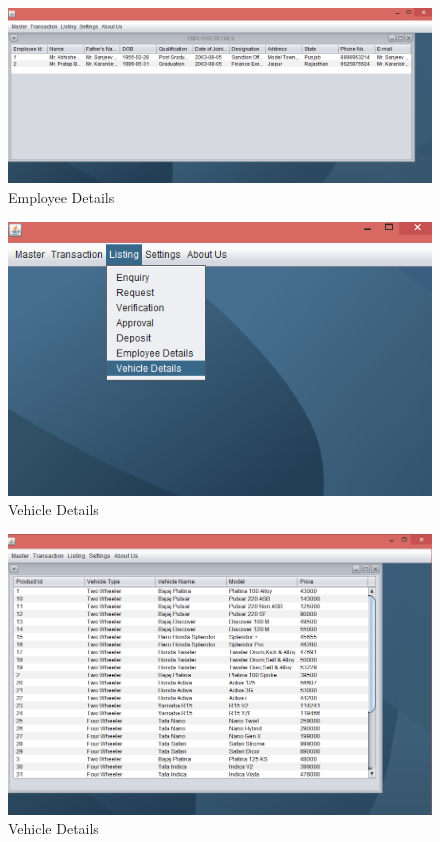 \clearpage
\begin{figure}[ht]
\begin{center}
\includegraphics[scale=0.5]{images/image43.png}
\end{center}
\caption{Employee Details}
\label{Employee Details}
\end{figure}

\begin{figure}[ht]
\begin{center}
\includegraphics[scale=0.5]{images/image44.png}
\end{center}
\caption{Vehicle Details}
\label{Vehicle Details}
\end{figure}

\begin{figure}[ht]
\begin{center}
\includegraphics[scale=0.5]{images/image45.png}
\end{center}
\caption{Vehicle Details}
\label{Vehicle Details}
\end{figure}

